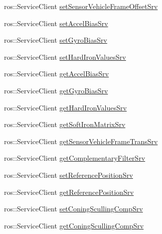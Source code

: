 \begin{DoxyCompactItemize}
ros\+::\+Service\+Client \hyperlink{classcl__microstrain__mips_1_1ClMicrostainMips_a977cce1917e12d96f614266baa4ae55d}{set\+Sensor\+Vehicle\+Frame\+Offset\+Srv}
\item 
ros\+::\+Service\+Client \hyperlink{classcl__microstrain__mips_1_1ClMicrostainMips_ae2ea11655cba06e49307780d1f95e197}{set\+Accel\+Bias\+Srv}
\item 
ros\+::\+Service\+Client \hyperlink{classcl__microstrain__mips_1_1ClMicrostainMips_a29fcea0897ca3bd7a036ab5c1856b86c}{set\+Gyro\+Bias\+Srv}
\item 
ros\+::\+Service\+Client \hyperlink{classcl__microstrain__mips_1_1ClMicrostainMips_abab500a095515c133d5edfea23736fad}{set\+Hard\+Iron\+Values\+Srv}
\item 
ros\+::\+Service\+Client \hyperlink{classcl__microstrain__mips_1_1ClMicrostainMips_a79547e77f9122ca67610f153657ec8ac}{get\+Accel\+Bias\+Srv}
\item 
ros\+::\+Service\+Client \hyperlink{classcl__microstrain__mips_1_1ClMicrostainMips_a2f3eaec7f31a54d833773ebb5eb03b64}{get\+Gyro\+Bias\+Srv}
\item 
ros\+::\+Service\+Client \hyperlink{classcl__microstrain__mips_1_1ClMicrostainMips_a11169f770102e9cff7f3b45c96fb4881}{get\+Hard\+Iron\+Values\+Srv}
\item 
ros\+::\+Service\+Client \hyperlink{classcl__microstrain__mips_1_1ClMicrostainMips_a7210454a851669073d06d82511014ecc}{get\+Soft\+Iron\+Matrix\+Srv}
\item 
ros\+::\+Service\+Client \hyperlink{classcl__microstrain__mips_1_1ClMicrostainMips_abeafc4f48f26ddd264e61b6cf97c779f}{get\+Sensor\+Vehicle\+Frame\+Trans\+Srv}
\item 
ros\+::\+Service\+Client \hyperlink{classcl__microstrain__mips_1_1ClMicrostainMips_a39aa3d9d1bbe86d90548f7422aa0b4a4}{get\+Complementary\+Filter\+Srv}
\item 
ros\+::\+Service\+Client \hyperlink{classcl__microstrain__mips_1_1ClMicrostainMips_a778117029f93a6cff9c5e2a0dac9742b}{set\+Reference\+Position\+Srv}
\item 
ros\+::\+Service\+Client \hyperlink{classcl__microstrain__mips_1_1ClMicrostainMips_a1f9b56f826c67a2e1d8a33e0879053bc}{get\+Reference\+Position\+Srv}
\item 
ros\+::\+Service\+Client \hyperlink{classcl__microstrain__mips_1_1ClMicrostainMips_ae24545c615e2be170adced3999d94d84}{set\+Coning\+Sculling\+Comp\+Srv}
\item 
ros\+::\+Service\+Client \hyperlink{classcl__microstrain__mips_1_1ClMicrostainMips_a877393b5cf4c313e0e433e9c92163265}{get\+Coning\+Sculling\+Comp\+Srv}

\end{DoxyCompactItemize}
